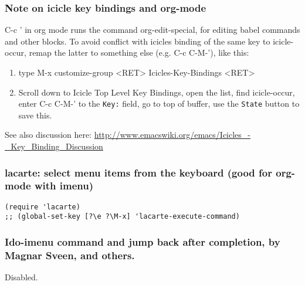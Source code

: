 \documentclass[nofonts]{tufte-handout}
\begin{document}
\subsubsection{Note on icicle key bindings and org-mode}
\label{sec-1-11-10}

C-c ' in org mode runs the command org-edit-special, for editing babel commands and other blocks.  To avoid conflict with icicles binding of the same key to icicle-occur, remap the latter to something else (e.g. C-c C-M-'), like this:
\begin{enumerate}
\item type M-x customize-group <RET> Icicles-Key-Bindings <RET>
\item Scroll down to Icicle Top Level Key Bindings, open the list, find icicle-occur, enter C-c C-M-' to the \texttt{Key:} field, go to top of buffer, use the \texttt{State} button to save this.
\end{enumerate}

See also discussion here: \url{http://www.emacswiki.org/emacs/Icicles_-_Key_Binding_Discussion}

\subsubsection{lacarte: select menu items from the keyboard (good for org-mode with imenu)}
\label{sec-1-11-11}

\begin{verbatim}
(require 'lacarte)
;; (global-set-key [?\e ?\M-x] 'lacarte-execute-command)
\end{verbatim}

\subsubsection{Ido-imenu command and jump back after completion, by Magnar Sveen, and others.}
\label{sec-1-11-12}

Disabled.
\end{document}
